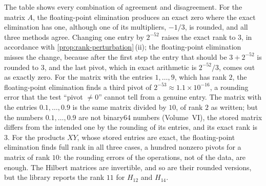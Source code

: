 The table shows every combination of agreement and disagreement. For the matrix $A$, the floating-point elimination produces an exact zero where the exact elimination has one, although one of its multipliers, $-1/3$, is rounded, and all three methods agree. Changing one entry by $2^{-52}$ raises the exact rank to $3$, in accordance with \cref{prop:rank-perturbation}\,(ii); the floating-point elimination misses the change, because after the first step the entry that should be $3+2^{-52}$ is rounded to $3$, and the last pivot, which in exact arithmetic is $2^{-52}/3$, comes out as exactly zero. For the matrix with the entries $1,\ldots,9$, which has rank $2$, the floating-point elimination finds a third pivot of $2^{-53}\approx1.1\times10^{-16}$, a rounding error that the test ``pivot $\ne0$'' cannot tell from a genuine entry. The matrix with the entries $0.1,\ldots,0.9$ is the same matrix divided by $10$, of rank $2$ as written; but the numbers $0.1,\ldots,0.9$ are not binary64 numbers (Volume~VI), the stored matrix differs from the intended one by the rounding of its entries, and its exact rank is $3$. For the products $XY$, whose stored entries are exact, the floating-point elimination finds full rank in all three cases, a hundred nonzero pivots for a matrix of rank $10$: the rounding errors of the operations, not of the data, are enough. The Hilbert matrices are invertible, and so are their rounded versions, but the library reports the rank $11$ for $H_{12}$ and $H_{14}$.

